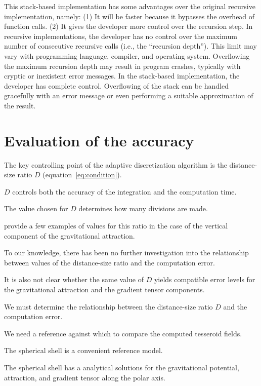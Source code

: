 \documentclass[paper,twocolumn]{geophysics}
\begin{document}
This stack-based implementation
has some advantages over the original recursive implementation,
namely:
(1) It will be faster because it bypasses the overhead of function calls.
(2) It gives the developer more control over the recursion step.
In recursive implementations,
the developer has no control over
the maximum number of consecutive recursive calls
(i.e., the ``recursion depth'').
This limit may vary with programming language,
compiler, and operating system.
Overflowing the maximum recursion depth
may result in program crashes,
typically with cryptic or inexistent error messages.
In the stack-based implementation,
the developer has complete control.
Overflowing of the stack can be handled gracefully
with an error message
or even performing a suitable approximation of the result.


\section{Evaluation of the accuracy}

The key controlling point of the adaptive discretization algorithm
is the distance-size ratio $D$ (equation~\ref{eq:condition}).

$D$ controls both the accuracy of the integration and the computation time.

The value chosen for $D$ determines how many divisions are made.

\citet{Li2011} provide a few examples of values for this ratio in the case of
the vertical component of the gravitational attraction.

To our knowledge,
there has been no further investigation
into the relationship between
values of the distance-size ratio and the computation error.

It is also not clear whether
the same value of $D$ yields compatible error levels
for the gravitational attraction
and the gradient tensor components.


We must determine the relationship between the distance-size ratio $D$ and
the computation error.

We need a reference against which to compare the computed tesseroid fields.

The spherical shell is a convenient reference model.

The spherical shell has a analytical solutions for the gravitational potential,
attraction, and gradient tensor along the polar axis.
\end{document}
